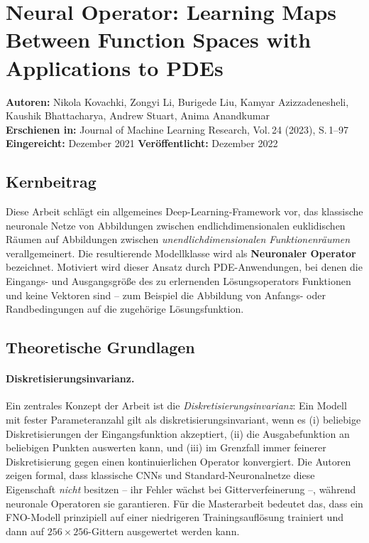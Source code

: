 \documentclass[a4paper,12pt]{article}
\begin{document}
\section*{Neural Operator: Learning Maps Between Function Spaces with Applications to PDEs}

\noindent\textbf{Autoren:} Nikola Kovachki, Zongyi Li, Burigede Liu,
Kamyar Azizzadenesheli, Kaushik Bhattacharya, Andrew Stuart, Anima Anandkumar\\[2pt]
\textbf{Erschienen in:} Journal of Machine Learning Research, Vol.\,24 (2023), S.\,1--97\\
\textbf{Eingereicht:} Dezember 2021 \quad \textbf{Veröffentlicht:} Dezember 2022

\subsection*{Kernbeitrag}

Diese Arbeit schlägt ein allgemeines Deep-Learning-Framework vor, das klassische
neuronale Netze von Abbildungen zwischen endlichdimensionalen euklidischen Räumen
auf Abbildungen zwischen \emph{unendlichdimensionalen Funktionenräumen} verallgemeinert.
Die resultierende Modellklasse wird als \textbf{Neuronaler Operator} bezeichnet.
Motiviert wird dieser Ansatz durch PDE-Anwendungen, bei denen die Eingangs- und
Ausgangsgröße des zu erlernenden Lösungsoperators Funktionen und keine Vektoren sind
-- zum Beispiel die Abbildung von Anfangs- oder Randbedingungen auf die zugehörige
Lösungsfunktion.

\subsection*{Theoretische Grundlagen}

\paragraph{Diskretisierungsinvarianz.}
Ein zentrales Konzept der Arbeit ist die \emph{Diskretisierungsinvarianz}:
Ein Modell mit fester Parameteranzahl gilt als diskretisierungsinvariant, wenn es
(i) beliebige Diskretisierungen der Eingangsfunktion akzeptiert,
(ii) die Ausgabefunktion an beliebigen Punkten auswerten kann, und
(iii) im Grenzfall immer feinerer Diskretisierung gegen einen kontinuierlichen
Operator konvergiert.
Die Autoren zeigen formal, dass klassische CNNs und Standard-Neuronalnetze diese
Eigenschaft \emph{nicht} besitzen -- ihr Fehler wächst bei Gitterverfeinerung --,
während neuronale Operatoren sie garantieren.
Für die Masterarbeit bedeutet das, dass ein FNO-Modell prinzipiell auf einer
niedrigeren Trainingsauflösung trainiert und dann auf $256{\times}256$-Gittern
ausgewertet werden kann.
\end{document}
